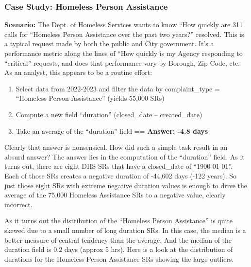 \documentclass[12pt, titlepage]{article}
\begin{document}
\subsubsection{Case Study: Homeless Person Assistance}
\label{sec:homlessassistance}
	\textbf{Scenario:} The Dept. of Homeless Services wants to 
	know ``How quickly are 311 calls for ``Homeless Person Assistance 
	over the past two years?'' resolved. This is a typical request made by 
	both the public and City government. It's a performance metric along 
	the lines of ``How quickly is my Agency responding to ``critical'' 
	requests, and does that performance vary by Borough, Zip Code, etc. 
	As an analyst, this appears to be a routine effort: 
		
	\begin{enumerate}
	    \item Select data from 2022-2023 and filter the data by 
	    complaint\_type = ``Homeless Person Assistance'' (yields 55,000 SRs)
	    \item Compute a new field ``duration'' (closed\_date – created\_date)
	    \item Take an average of the ``duration'' field == \textbf{Answer:  -4.8 days}  
	\end{enumerate}
		
	Clearly that answer is nonsensical. How did such a simple task result 
	in an absurd answer? The answer lies in the computation of the ``duration'' 
	field. As it turns out, there are eight DHS SRs that have a closed\_date 
	of ``1900-01-01''. Each of those SRs creates a negative duration of -44,602 
	days (-122 years). So just those eight SRs with extreme negative duration 
	values is enough to drive the average of the 75,000 
	Homeless Assistance SRs to a negative value, clearly incorrect.
		
	As it turns out the distribution of the ``Homeless Person Assistance'' is 
	quite skewed due to a small number of long duration SRs. In this case, 
	the median is a better measure of central tendency than the average. 
	And the median of the duration field is  0.2 days (approx 5 hrs). 
	Here is a look at the distribution of durations for the Homeless Person 
	Assistance SRs showing 	the large outliers. 
		
\end{document}
